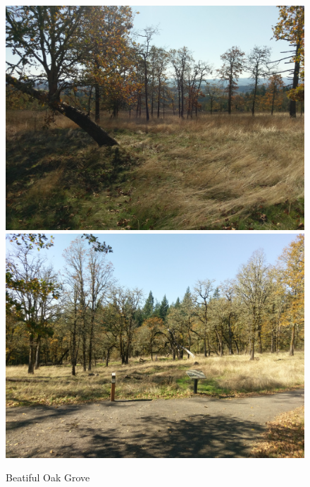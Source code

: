 \documentclass{article}
\begin{document}
\begin{figure}[H]
\centering{}
\caption{Beatiful Oak Grove}
\includegraphics[scale=0.065]{oak_woodlands1.jpg}
\label{}
\includegraphics[scale=0.065]{oak_woodlands2.jpg}
\end{figure}
\end{document}

